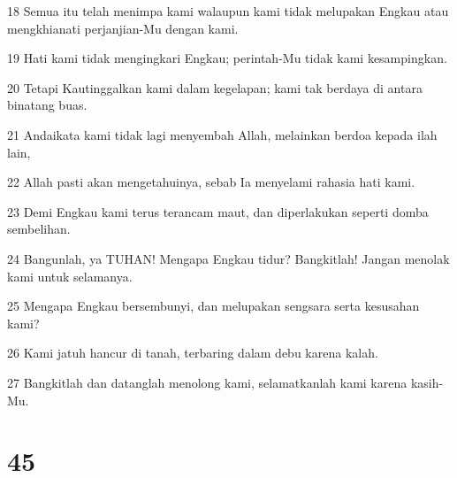 \par 18 Semua itu telah menimpa kami walaupun kami tidak melupakan Engkau atau mengkhianati perjanjian-Mu dengan kami.
\par 19 Hati kami tidak mengingkari Engkau; perintah-Mu tidak kami kesampingkan.
\par 20 Tetapi Kautinggalkan kami dalam kegelapan; kami tak berdaya di antara binatang buas.
\par 21 Andaikata kami tidak lagi menyembah Allah, melainkan berdoa kepada ilah lain,
\par 22 Allah pasti akan mengetahuinya, sebab Ia menyelami rahasia hati kami.
\par 23 Demi Engkau kami terus terancam maut, dan diperlakukan seperti domba sembelihan.
\par 24 Bangunlah, ya TUHAN! Mengapa Engkau tidur? Bangkitlah! Jangan menolak kami untuk selamanya.
\par 25 Mengapa Engkau bersembunyi, dan melupakan sengsara serta kesusahan kami?
\par 26 Kami jatuh hancur di tanah, terbaring dalam debu karena kalah.
\par 27 Bangkitlah dan datanglah menolong kami, selamatkanlah kami karena kasih-Mu.

\chapter{45}

